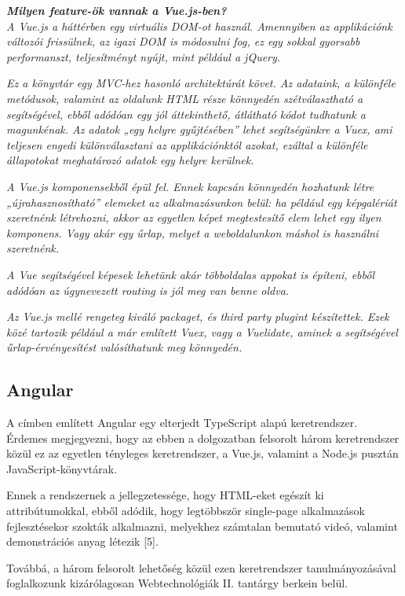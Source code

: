 \noindent\textit{\textbf{Milyen feature-ök vannak a Vue.js-ben?}}\\

\textit{A Vue.js a háttérben egy virtuális DOM-ot használ. Amennyiben az applikációnk változói frissülnek, az igazi DOM is módosulni fog, ez egy sokkal gyorsabb performanszt, teljesítményt nyújt, mint például a jQuery.}

\textit{Ez a könyvtár egy MVC-hez hasonló architektúrát követ. Az adataink, a különféle metódusok, valamint az oldalunk HTML része könnyedén szétválasztható a segítségével, ebből adódóan egy jól áttekinthető, átlátható kódot tudhatunk a magunkénak. Az adatok „egy helyre gyűjtésében” lehet segítségünkre a Vuex, ami teljesen engedi különválasztani az applikációnktól azokat, ezáltal a különféle állapotokat meghatározó adatok egy helyre kerülnek.}

\textit{A Vue.js komponensekből épül fel. Ennek kapcsán könnyedén hozhatunk létre „újrahasznosítható” elemeket az alkalmazásunkon belül: ha például egy képgalériát szeretnénk létrehozni, akkor az egyetlen képet megtestesítő elem lehet egy ilyen komponens. Vagy akár egy űrlap, melyet a weboldalunkon máshol is használni szeretnénk.}

\textit{A Vue segítségével képesek lehetünk akár többoldalas appokat is építeni, ebből adódóan az úgynevezett routing is jól meg van benne oldva.}

\textit{Az Vue.js mellé rengeteg kiváló packaget, és third party plugint készítettek. Ezek közé tartozik például a már említett Vuex, vagy a Vuelidate, aminek a segítségével űrlap-érvényesítést valósíthatunk meg könnyedén.}

\subsection{Angular}

A címben említett Angular egy elterjedt TypeScript alapú keretrendszer. Érdemes megjegyezni, hogy az ebben a dolgozatban felsorolt három keretrendszer közül ez az egyetlen tényleges keretrendszer, a Vue.js, valamint a Node.js pusztán JavaScript-könyvtárak.

Ennek a rendszernek a jellegzetessége, hogy HTML-eket egészít ki attribútumokkal, ebből adódik, hogy legtöbbször single-page alkalmazások fejlesztésekor szokták alkalmazni, melyekhez számtalan bemutató videó, valamint demonstrációs anyag létezik [5].

Továbbá, a három felsorolt lehetőség közül ezen keretrendszer tanulmányozásával foglalkozunk kizárólagosan Webtechnológiák II. tantárgy berkein belül.


